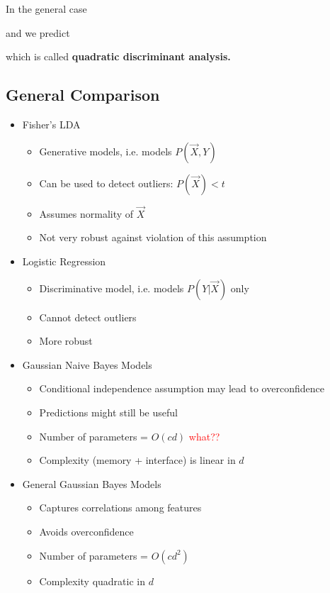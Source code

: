 \documentclass[10pt,a4paper]{scrartcl}
\begin{document}
\begin{multicols*}{2}
In the general case 


and we predict


which is called \textbf{quadratic discriminant analysis.}

\subsection{General Comparison}

\begin{itemize}
\item Fisher's LDA
\begin{itemize}
\item Generative models, i.e. models $P(\vec{X},Y)$
\item[+] Can be used to detect outliers: $P(\vec{X})<t$
\item Assumes normality of $\vec{X}$
\item[-] Not very robust against violation of this assumption
\end{itemize}
\item Logistic Regression
\begin{itemize}
\item Discriminative model, i.e. models $P(Y|\vec{X})$ only
\item[-] Cannot detect outliers
\item[\ast[ Makes no assumptions on $\vec{X}$
\item[+] More robust
\end{itemize}
\item Gaussian Naive Bayes Models
\begin{itemize}
\item[-] Conditional independence assumption may lead to overconfidence 
\item[+] Predictions might still be useful
\item[+] Number of parameters = $O(c d)$ \textcolor{red}{what??}
\item Complexity (memory + interface) is linear in $d$
\end{itemize}
\item General Gaussian Bayes Models
\begin{itemize}
\item[+] Captures correlations among features
\item[+] Avoids overconfidence
\item[-] Number of parameters = $O(c d^2)$
\item[-] Complexity quadratic in $d$
\end{itemize}
\end{itemize}


\end{multicols*}
\end{document}
